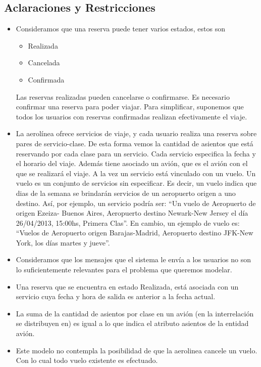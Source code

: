 \subsection{Aclaraciones y Restricciones}
  \begin{itemize}
    \item Consideramos que una reserva puede tener varios estados, estos son
          \begin{itemize}
            \item   Realizada
            \item   Cancelada
            \item   Confirmada
          \end{itemize}

          Las reservas realizadas pueden cancelarse o confirmarse.
          Es necesario confirmar una reserva para poder viajar.
          Para simplificar, suponemos que todos los usuarios con reservas
          confirmadas realizan efectivamente el viaje.
    
    \item La aerolínea ofrece servicios de viaje, y cada usuario realiza una
          reserva sobre pares de servicio-clase.
          De esta forma vemos la cantidad de asientos que está reservando por
          cada clase para un servicio.
          Cada servicio especifica la fecha y el horario del viaje. Además 
          tiene asociado un avión, que es el avión con el que se realizará
          el viaje.
          A la vez un servicio está vinculado con un vuelo. Un vuelo es
          un conjunto de servicios sin especificar. Es decir, un vuelo indica 
          que dias de la semana se brindarán servicios de un aeropuerto origen 
          a uno destino.
          Así, por ejemplo, un servicio podría ser:
          ``Un vuelo de Aeropuerto de origen Ezeiza- Buenos Aires, Aeropuerto 
          destino Newark-New Jersey el día 26/04/2013, 15:00hs, Primera Clas''.
          En cambio, un ejemplo de vuelo es:
         ``Vuelos de Aeropuerto origen Barajas-Madrid, Aeropuerto destino 
          JFK-New York, los días martes y jueve''.
	
    \item Consideramos que los mensajes que el sistema le envía a los usuarios
          no son lo suficientemente relevantes para el problema que queremos
          modelar.
          
    \item Una reserva que se encuentra en estado Realizada, está asociada con un
    	  servicio cuya fecha y hora de salida es anterior a la fecha actual.
    	  
	\item La suma de la cantidad de asientos por clase en un avión (en la 
		  interrelación se distribuyen en) es igual a lo que indica el 
		  atributo asientos de la entidad avión.
	
	\item Este modelo no contempla la posibilidad de que la aerolinea cancele un
		  vuelo. Con lo cual todo vuelo existente es efectuado.
            
  \end{itemize}